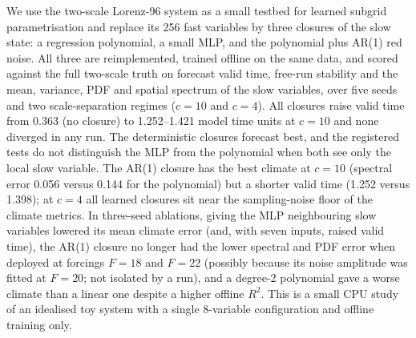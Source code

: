 We use the two-scale Lorenz-96 system as a small testbed for learned subgrid parametrisation and replace its 256 fast variables by three closures of the slow state: a regression polynomial, a small MLP, and the polynomial plus AR(1) red noise. All three are reimplemented, trained offline on the same data, and scored against the full two-scale truth on forecast valid time, free-run stability and the mean, variance, PDF and spatial spectrum of the slow variables, over five seeds and two scale-separation regimes ($c=10$ and $c=4$). All closures raise valid time from 0.363 (no closure) to 1.252--1.421 model time units at $c=10$ and none diverged in any run. The deterministic closures forecast best, and the registered tests do not distinguish the MLP from the polynomial when both see only the local slow variable. The AR(1) closure has the best climate at $c=10$ (spectral error 0.056 versus 0.144 for the polynomial) but a shorter valid time (1.252 versus 1.398); at $c=4$ all learned closures sit near the sampling-noise floor of the climate metrics. In three-seed ablations, giving the MLP neighbouring slow variables lowered its mean climate error (and, with seven inputs, raised valid time), the AR(1) closure no longer had the lower spectral and PDF error when deployed at forcings $F{=}18$ and $F{=}22$ (possibly because its noise amplitude was fitted at $F{=}20$; not isolated by a run), and a degree-2 polynomial gave a worse climate than a linear one despite a higher offline $R^2$. This is a small CPU study of an idealised toy system with a single 8-variable configuration and offline training only.

